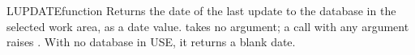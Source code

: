\begin{XbaseEntry}{LUPDATE}{function}
Returns the date of the last update to the database in the selected work area, as a date value.
\Syntax
{}
\Usage
{} takes no argument; a call with any argument raises . With no database in USE, it returns a blank date.
\Examples
{}
\end{XbaseEntry}

